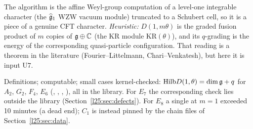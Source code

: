 \begin{physics}
The algorithm is the affine Weyl-group computation of a level-one integrable character (the $\widehat{\mathfrak g}_1$
WZW vacuum module) truncated to a Schubert cell, so it is a piece of a genuine CFT character. \emph{Heuristic:}
$D(1,m\theta)$ is the graded fusion product of $m$ copies of $\mathfrak g\oplus{\mathbb{C}}$ (the KR module
$\mathrm{KR}(\theta)$), and its $q$-grading is the energy of the corresponding quasi-particle configuration. That reading
is a theorem in the literature (Fourier--Littelmann, Chari--Venkatesh), but here it is input U7.
\end{physics}
\begin{status}
Definitions; computable; small cases kernel-checked: $\mathrm{Hilb}D(1,\theta)=\dim\mathfrak g+q$ for $A_2$, $G_2$,
$F_4$, $E_6$ (, , ,
), all in the library. For $E_7$ the corresponding check lies outside the library
(Section~\ref{l25:sec:defects}). For $E_8$ a single  at $m=1$ exceeded 10 minutes (a dead end); $C_1$ is
instead pinned by the chain files of Section~\ref{l25:sec:data}.
\end{status}

